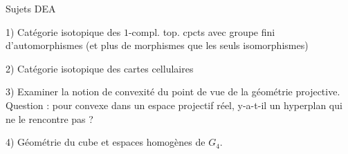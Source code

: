 Sujets DEA

1) Catégorie isotopique des \(1\)-compl. top. cpcts avec groupe fini d'automorphismes (et plus de morphismes que les seuls isomorphismes)

2) Catégorie isotopique des cartes cellulaires

3) Examiner la notion de convexité du point de vue de la géométrie projective. Question : pour  convexe dans un espace projectif réel, y-a-t-il un hyperplan qui ne le rencontre pas ?

4) Géométrie du cube et espaces homogènes de \(G_4\).
